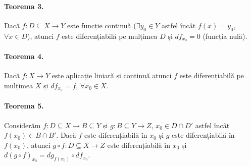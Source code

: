 \paragraph{Teorema 3.}
Dacă $f:D \subseteq X \rightarrow Y$ este funcție continuă ($\exists y_{0} \in Y$ astfel încât $f(x) = y_{0}$, $\forall x \in D$), atunci $f$ este diferențiabilă pe mulțimea
$D$ și $df_{x_{0}} = 0$ (funcția nulă).

\paragraph{Teorema 4.}
Dacă $f:X \rightarrow Y$ este aplicație liniară și continuă atunci $f$ este diferențiabilă pe mulțimea $X$ și $df_{x_{0}} = f$, $\forall x_{0} \in X$.

\paragraph{Teorema 5.}
Considerăm $f:D \subseteq X \rightarrow B \subseteq Y$ și $g:B \subseteq Y \rightarrow Z$, $x_{0} \in D \cap D'$ astfel încât $f(x_{0}) \in B \cap B'$.
Dacă $f$ este diferențiabilă în $x_{0}$ și $g$ este diferențiabilă în $f(x_{0})$, atunci $g \circ f:D \subseteq X \rightarrow Z$ este diferențiabilă în $x_{0}$ și
$d(g \circ f)_{x_{0}} = dg_{f(x_{0})} \circ df_{x_{0}}$.
